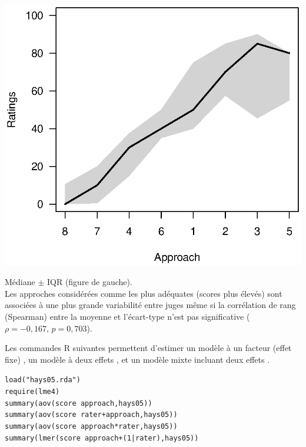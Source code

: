 \foilhead{}
\begin{minipage}{0.45\textwidth}
\centerline{\includegraphics[scale=.85]{./figs/hays05.eps}}
\end{minipage}\hfill
\begin{minipage}{0.5\textwidth}
\small
Médiane $\pm$ IQR (figure de gauche).\\
Les approches considérées comme les plus adéquates (scores plus élevés) sont
associées à une plus grande variabilité entre juges même si la corrélation de
rang (Spearman) entre la moyenne et l'écart-type n'est pas significative
($\rho=-0,167,\, p=0,703$). 
\end{minipage}


Les commandes R suivantes permettent d'estimer un modèle à un facteur (effet
fixe) , un modèle à deux effets , et un modèle mixte
incluant deux effets . 

\begin{alltt}
load("hays05.rda")
require(lme4)
summary(aov(score ~ approach, hays05)) \hfill{}
summary(aov(score ~ rater+approach, hays05)) \hfill{}
summary(aov(score ~ approach*rater, hays05)) \hfill{}
summary(lmer(score ~ approach + (1 | rater), hays05)) \hfill{}
\end{alltt}

